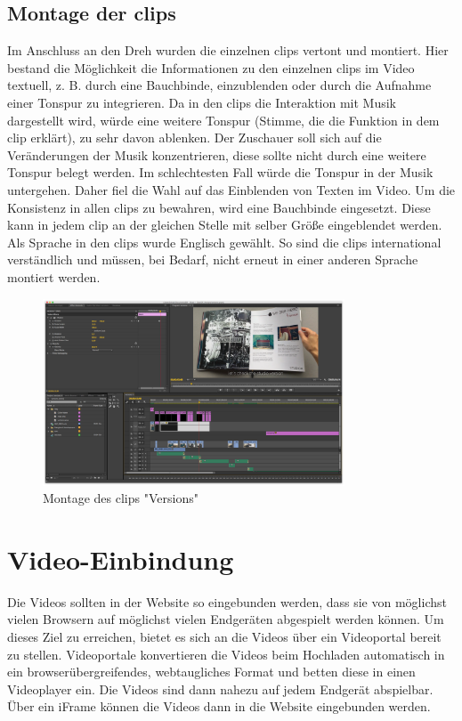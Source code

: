 \subsection{Montage der \gls{clip}s}
Im Anschluss an den Dreh wurden die einzelnen \gls{clip}s vertont und montiert. Hier bestand die Möglichkeit die Informationen zu den einzelnen \gls{clip}s im Video textuell, z. B. durch eine Bauchbinde, einzublenden oder durch die Aufnahme einer Tonspur zu integrieren. Da in den \gls{clip}s die Interaktion mit Musik dargestellt wird, würde eine weitere Tonspur (Stimme, die die Funktion in dem \gls{clip} erklärt), zu sehr davon ablenken. Der Zuschauer soll sich auf die Veränderungen der Musik konzentrieren, diese sollte nicht durch eine weitere Tonspur belegt werden. Im schlechtesten Fall würde die Tonspur in der Musik untergehen. Daher fiel die Wahl auf das Einblenden von Texten im Video. Um die Konsistenz in allen \gls{clip}s zu bewahren, wird eine Bauchbinde eingesetzt. Diese kann in jedem \gls{clip} an der gleichen Stelle mit selber Größe eingeblendet werden.\\
Als Sprache in den \gls{clip}s wurde Englisch gewählt. So sind die \gls{clip}s international verständlich und müssen, bei Bedarf, nicht erneut in einer anderen Sprache montiert werden.


\begin{figure}[H]
\centering
\includegraphics[width=0.8\textwidth]{grafiken/montagefilm.png}
\caption{Montage des \gls{clip}s "Versions"}
\end{figure}


\section{Video-Einbindung}
Die Videos sollten in der Website so eingebunden werden, dass sie von möglichst vielen Browsern auf möglichst vielen Endgeräten abgespielt werden können. Um dieses Ziel zu erreichen, bietet es sich an die Videos über ein Videoportal bereit zu stellen. Videoportale konvertieren die Videos beim Hochladen automatisch in ein browserübergreifendes, webtaugliches Format und betten diese in einen Videoplayer ein. Die Videos sind dann nahezu auf jedem Endgerät abspielbar. Über ein iFrame können die Videos dann in die Website eingebunden werden.\\

